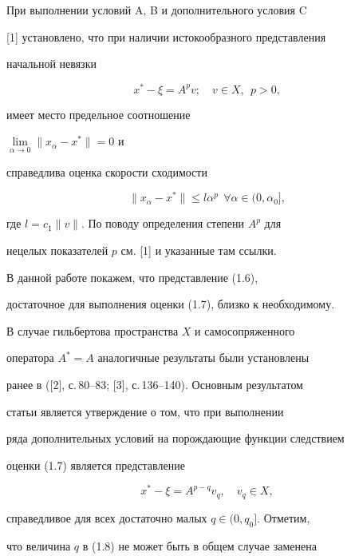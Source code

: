 При выполнении условий A, B и дополнительного условия C


[1] установлено, что при наличии истокообразного представления 


начальной невязки


\begin{equation}


x^*-\xi=A^p v;\quad v\in X,\ \ p>0,


\end{equation}


имеет место предельное соотношение 


$\lim\limits_{\alpha\to0}\|x_\alpha-x^*\|=0$ и


справедлива оценка скорости сходимости


\begin{equation}


\|x_\alpha-x^*\|\le l \alpha^p\ \ \forall \alpha\in(0,\alpha_0],


\end{equation}


где $l=c_1\|v\|$. По поводу определения степени $A^p$ для 


нецелых показателей $p$ см. [1] и указанные там ссылки.





В данной работе покажем, что представление (1.6), 


достаточное для выполнения оценки (1.7), близко к необходимому. 


В случае гильбертова пространства $X$ и самосопряженного 


оператора $A^*=A$ аналогичные результаты были установлены 


ранее в ([2], с.\,80--83; [3], с.\,136--140). Основным результатом 


статьи является утверждение о том, что при выполнении 


ряда дополнительных условий на порождающие функции следствием 


оценки (1.7) является представление


\begin{equation}


x^*-\xi=A^{p-q}v_q,\quad v_q\in X,


\end{equation}


справедливое для всех достаточно малых $q\in(0,q_0]$. Отметим, 


что величина $q$ в (1.8) не может быть в общем случае заменена 


